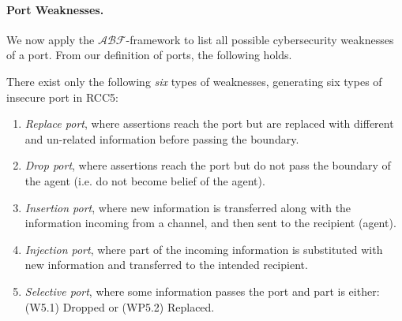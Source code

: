 \documentclass[runningheads]{llncs}
\newcommand{\assertionRegion}{\mathcal{A}}
\newcommand{\beliefRegion}{\mathcal{B}}
\newcommand{\factRegion}{\mathcal{F}}
\newcommand{\abftheory}{\assertionRegion\beliefRegion\factRegion}
\begin{document}
\paragraph{Port Weaknesses.} We now apply the $\abftheory$-framework to
list all possible cybersecurity weaknesses of a port. From our definition of ports, the following holds.
\begin{theorem}\label{thm:pw}
There exist only the following \emph{six}
types of weaknesses, generating six types of insecure port in RCC5:
\begin{enumerate}[start=1, label={W\arabic*)}]
	\item \emph{Replace port}, where assertions reach
		the port but are replaced with different and un-related information
		before passing the boundary.
	\item \emph{Drop port}, where assertions reach the
		port but do not pass the boundary of the agent (i.e. do not
		become belief of the agent).
	\item \emph{Insertion port}, where new information is transferred along with 
		the information incoming from a channel, and then sent to
		the recipient (agent).
	\item \emph{Injection port}, where part of the incoming information
		is substituted with new information and transferred to the intended recipient.
	\item \emph{Selective port}, where some information passes the port and
    part is either: (W5.1) Dropped or (WP5.2) Replaced.
\end{enumerate}
\end{theorem}
\end{document}
